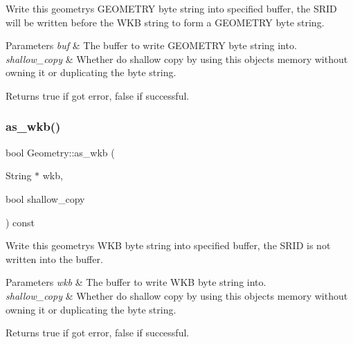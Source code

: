 Write this geometry\textquotesingle{}s G\+E\+O\+M\+E\+T\+RY byte string into specified buffer, the S\+R\+ID will be written before the W\+KB string to form a G\+E\+O\+M\+E\+T\+RY byte string.


\begin{DoxyParams}{Parameters}
{\em buf} & The buffer to write G\+E\+O\+M\+E\+T\+RY byte string into. \\
\hline
{\em shallow\+\_\+copy} & Whether do shallow copy by using this object\textquotesingle{}s memory without owning it or duplicating the byte string. \\
\hline
\end{DoxyParams}
\begin{DoxyReturn}{Returns}
true if got error, false if successful. 
\end{DoxyReturn}
\mbox{\label{classGeometry_aeb83e5312a7333a7e908d0623b170c97}} 
\subsubsection{\texorpdfstring{as\+\_\+wkb()}{as\_wkb()}}
{\footnotesize\ttfamily bool Geometry\+::as\+\_\+wkb (\begin{DoxyParamCaption}\item[{String $\ast$}]{wkb,  }\item[{bool}]{shallow\+\_\+copy }\end{DoxyParamCaption}) const}

Write this geometry\textquotesingle{}s W\+KB byte string into specified buffer, the S\+R\+ID is not written into the buffer.


\begin{DoxyParams}{Parameters}
{\em wkb} & The buffer to write W\+KB byte string into. \\
\hline
{\em shallow\+\_\+copy} & Whether do shallow copy by using this object\textquotesingle{}s memory without owning it or duplicating the byte string. \\
\hline
\end{DoxyParams}
\begin{DoxyReturn}{Returns}
true if got error, false if successful. 
\end{DoxyReturn}
\mbox{\label{classGeometry_af9294b8724cd69b7e1e52b84bbccc034}} 
